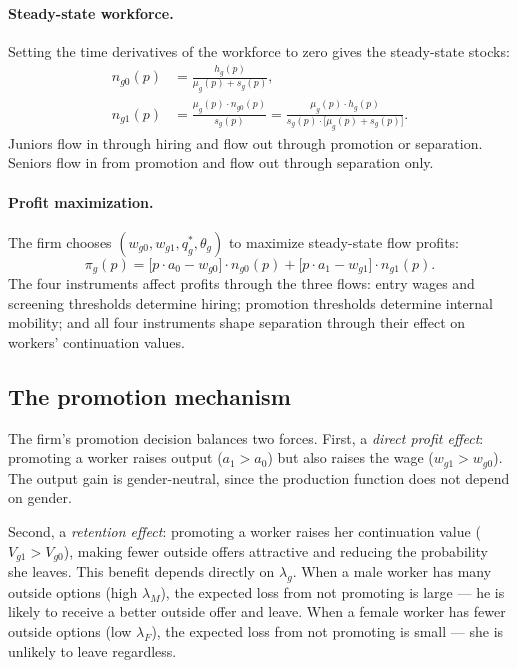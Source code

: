 \documentclass[11pt]{article}
\begin{document}
\paragraph{Steady-state workforce.} Setting the time derivatives of the workforce to zero gives the steady-state stocks:
\begin{align*}
    n_{g0}(p) &= \frac{h_g(p)}{\mu_g(p) + s_g(p)}, \\[4pt]
    n_{g1}(p) &= \frac{\mu_g(p) \cdot n_{g0}(p)}{s_g(p)} = \frac{\mu_g(p) \cdot h_g(p)}{s_g(p) \cdot \bigl[\mu_g(p) + s_g(p)\bigr]}.
\end{align*}
Juniors flow in through hiring and flow out through promotion or separation. Seniors flow in from promotion and flow out through separation only.

\paragraph{Profit maximization.} The firm chooses $(w_{g0}, w_{g1}, q_g^*, \theta_g)$ to maximize steady-state flow profits:
\begin{equation*}
    \pi_g(p) = \bigl[p \cdot a_0 - w_{g0}\bigr] \cdot n_{g0}(p) + \bigl[p \cdot a_1 - w_{g1}\bigr] \cdot n_{g1}(p).
\end{equation*}
The four instruments affect profits through the three flows: entry wages and screening thresholds determine hiring; promotion thresholds determine internal mobility; and all four instruments shape separation through their effect on workers' continuation values.

\subsection{The promotion mechanism}

The firm's promotion decision balances two forces. First, a \textit{direct profit effect}: promoting a worker raises output ($a_1 > a_0$) but also raises the wage ($w_{g1} > w_{g0}$). The output gain is gender-neutral, since the production function does not depend on gender.

Second, a \textit{retention effect}: promoting a worker raises her continuation value ($V_{g1} > V_{g0}$), making fewer outside offers attractive and reducing the probability she leaves. This benefit depends directly on $\lambda_g$. When a male worker has many outside options (high $\lambda_M$), the expected loss from not promoting is large --- he is likely to receive a better outside offer and leave. When a female worker has fewer outside options (low $\lambda_F$), the expected loss from not promoting is small --- she is unlikely to leave regardless.
\end{document}
